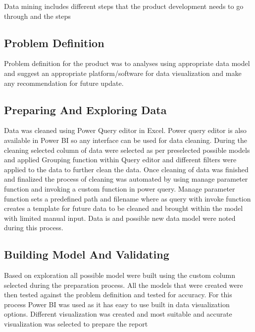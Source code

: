 \documentclass{article}
\begin{document}
Data mining includes different steps that the product development needs to go through and the steps
\subsection{Problem Definition}\label{Defination}
Problem definition for the product was to analyses using appropriate data model and suggest an appropriate platform/software for data visualization and make any recommendation for future update.
\subsection{Preparing And Exploring Data}\label{cleaning}
Data was cleaned using Power Query editor in Excel. Power query editor is also available in Power BI so any interface can be used for data cleaning. During the cleaning selected column of data were selected as per preselected possible models and applied Grouping function within Query editor and different filters were applied to the data to further clean the data. Once cleaning of data was finished and finalized the process of cleaning was automated by using manage parameter function and invoking a custom function in power query. Manage parameter function sets a predefined path and filename where as query with invoke function creates a template for future data to be cleaned and brought within the model with limited manual input. Data is  and possible new data model were noted during this process.
\subsection{Building Model And Validating}\label{building}
Based on exploration all possible model were built using the custom column selected during the  preparation process. All the models that were created were then tested against the problem definition and tested for accuracy. For this process Power BI was used as it has easy to use built in data visualization options. Different visualization was created and most suitable and accurate visualization was selected to prepare the report
\end{document}
